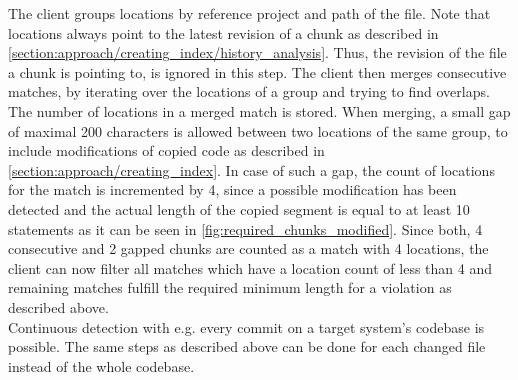 The client groups locations by reference project and path of the file.
Note that locations always point to the latest revision of a chunk as described in \autoref{section:approach/creating_index/history_analysis}.
Thus, the revision of the file a chunk is pointing to, is ignored in this step.
The client then merges consecutive matches, by iterating over the locations of a group and trying to find overlaps.
The number of locations in a merged match is stored.
When merging, a small gap of maximal 200 characters is allowed between two locations of the same group, to include modifications of copied code as described in \autoref{section:approach/creating_index}.
In case of such a gap, the count of locations for the match is incremented by 4, since a possible modification has been detected and the actual length of the copied segment is equal to at least 10 statements as it can be seen in \autoref{fig:required_chunks_modified}.
Since both, 4 consecutive and 2 gapped chunks are counted as a match with 4 locations, the client can now filter all matches which have a location count of less than 4 and remaining matches fulfill the required minimum length for a violation as described above.
\\
Continuous detection with e.g. every commit on a target system's codebase is possible.
The same steps as described above can be done for each changed file instead of the whole codebase.